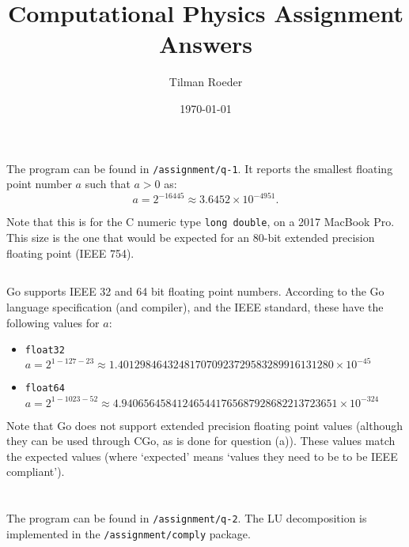 \documentclass[12pt, a4paper]{article}
\title{Computational Physics Assignment Answers}
\author{Tilman Roeder}
\date{\today}
\begin{document}
\maketitle

\section{}
  \subsection{}
  The program can be found in \texttt{/assignment/q-1}. It reports the smallest floating point number
  $a$ such that $a > 0$ as:
  \begin{equation}
    a = 2^{-16445} \approx 3.6452 \times 10^{-4951}.
  \end{equation}

  Note that this is for the C numeric type \texttt{long double}, on a 2017 MacBook Pro. This size
  is the one that would be expected for an 80-bit extended precision floating point (IEEE 754).

  \subsection{}
  Go supports IEEE 32 and 64 bit floating point numbers. According to the Go language specification
  (and compiler), and the IEEE standard, these have the following values for $a$:
  \begin{itemize}
    \item \texttt{float32} $a = 2^{1-127-23} \approx 1.401298464324817070923729583289916131280 \times 10^{-45}$
    \item \texttt{float64} $a = 2^{1-1023-52} \approx 4.940656458412465441765687928682213723651 \times 10^{-324}$
  \end{itemize}

  Note that Go does not support extended precision floating point values (although they can be used through
  CGo, as is done for question (a)). These values match the expected values (where `expected' means `values
  they need to be to be IEEE compliant').

\section{}
  \subsection{}
  The program can be found in \texttt{/assignment/q-2}. The LU decomposition is implemented in the
  \texttt{/assignment/comply} package.
\end{document}
